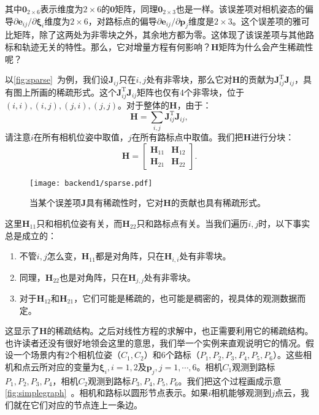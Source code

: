 其中$\bm{0}_{2 \times 6}$表示维度为$2 \times 6$的$\bm{0}$矩阵，同理$\bm{0}_{2 \times 3}$也是一样。该误差项对相机姿态的偏导${\partial \bm{e}_{ij}}/{\partial \bm{\xi}_i}$维度为$2 \times 6$，对路标点的偏导${\partial \bm{e}_{ij}}/{\partial \bm{p}_j}$维度是$2 \times 3$。这个误差项的雅可比矩阵，除了这两处为非零块之外，其余地方都为零。这体现了该误差项与其他路标和轨迹无关的特性。那么，它对增量方程有何影响？$\bm{H}$矩阵为什么会产生稀疏性呢？

以\autoref{fig:sparse}~为例，我们设$\bm{J}_{ij}$只在$i,j$处有非零块，那么它对$\bm{H}$的贡献为$\bm{J}_{ij}^\mathrm{T} \bm{J}_{ij}$，具有图上所画的稀疏形式。这个$\bm{J}_{ij}^\mathrm{T} \bm{J}_{ij}$矩阵也仅有4个非零块，位于$(i,i), (i,j), (j,i), (j,j)$。对于整体的$\bm{H}$，由于：
\begin{equation}
\bm{H} = \sum_{i,j} \bm{J}_{ij}^\mathrm{T} \bm{J}_{ij},
\end{equation}
请注意$i$在所有相机位姿中取值，$j$在所有路标点中取值。我们把$\bm{H}$进行分块：
\begin{equation}
\label{eq:H-blocks}
\bm{H} = \left[ {\begin{array}{*{20}{c}}
	{{\bm{H}_{11}}}&{{\bm{H}_{12}}}\\
	{{\bm{H}_{21}}}&{{\bm{H}_{22}}}
	\end{array}} \right] .
\end{equation}

\begin{figure}[!htp]
	\centering
	\texttt{[image: backend1/sparse.pdf]}
	\caption{当某个误差项$\bm{J}$具有稀疏性时，它对$\bm{H}$的贡献也具有稀疏形式。}
	\label{fig:sparse}
\end{figure}

这里$\bm{H}_{11}$只和相机位姿有关，而$\bm{H}_{22}$只和路标点有关。当我们遍历$i,j$时，以下事实总是成立的：
\begin{enumerate}
	\item 不管$i,j$怎么变，$\bm{H}_{11}$都是对角阵，只在$\bm{H}_{i,i}$处有非零块。
	\item 同理，$\bm{H}_{22}$也是对角阵，只在$\bm{H}_{j,j}$处有非零块。
	\item 对于$\bm{H}_{12}$和$\bm{H}_{21}$，它们可能是稀疏的，也可能是稠密的，视具体的观测数据而定。
\end{enumerate}

这显示了$\bm{H}$的稀疏结构。之后对线性方程的求解中，也正需要利用它的稀疏结构。也许读者还没有很好地领会这里的意思，我们举一个实例来直观说明它的情况。假设一个场景内有2个相机位姿（$C_1,C_2$）和6个路标（$P_1,P_2,P_3,P_4,P_5,P_6$）。这些相机和点云所对应的变量为$\bm{\xi}_i, i = 1,2$及$\bm{p}_j, j = 1,\cdots, 6$。相机$C_1$观测到路标$P_1,P_2,P_3,P_4$，相机$C_2$观测到路标$P_3,P_4,P_5,P_6$。我们把这个过程画成示意\autoref{fig:simplegraph}~。相机和路标以圆形节点表示。如果$i$相机能够观测到$j$点云，我们就在它们对应的节点连上一条边。

